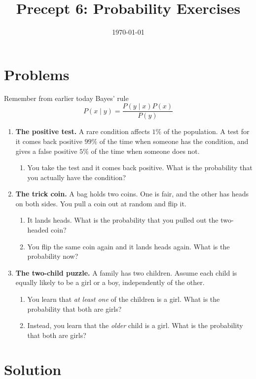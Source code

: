 \documentclass[11pt]{article}
\title{Precept 6: Probability Exercises}
\date{\today}
\begin{document}
\maketitle
\thispagestyle{fancy}

\section*{Problems}
Remember from earlier today Bayes' rule
\[
P(x\mid y) = \frac{P(y\mid x)P(x)}{P(y)}
\]

\begin{enumerate}
    \item \textbf{The positive test.} A rare condition affects $1\%$ of the population. A test for it comes back positive $99\%$ of the time when someone has the condition, and gives a false positive $5\%$ of the time when someone does not.
    \begin{enumerate}
        \item You take the test and it comes back positive. What is the probability that you actually have the condition?
    \end{enumerate}

    \item \textbf{The trick coin.} A bag holds two coins. One is fair, and the other has heads on both sides. You pull a coin out at random and flip it.
    \begin{enumerate}
        \item It lands heads. What is the probability that you pulled out the two-headed coin?
        \item You flip the same coin again and it lands heads again. What is the probability now?
    \end{enumerate}

    \item \textbf{The two-child puzzle.} A family has two children. Assume each child is equally likely to be a girl or a boy, independently of the other.
    \begin{enumerate}
        \item You learn that \emph{at least one} of the children is a girl. What is the probability that both are girls?
        \item Instead, you learn that the \emph{older} child is a girl. What is the probability that both are girls?
    \end{enumerate}
\end{enumerate}

\newpage
\section*{Solution}
\end{document}
